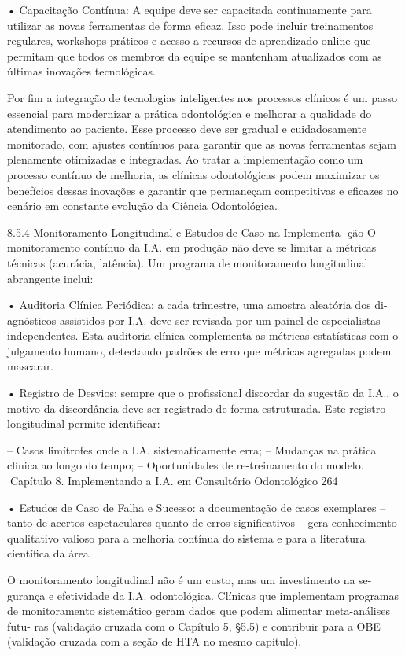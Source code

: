     • Capacitação Contínua: A equipe deve ser capacitada continuamente para utilizar
      as novas ferramentas de forma eficaz. Isso pode incluir treinamentos regulares,
      workshops práticos e acesso a recursos de aprendizado online que permitam
      que todos os membros da equipe se mantenham atualizados com as últimas
      inovações tecnológicas.

        Por fim a integração de tecnologias inteligentes nos processos clínicos é
um passo essencial para modernizar a prática odontológica e melhorar a qualidade
do atendimento ao paciente. Esse processo deve ser gradual e cuidadosamente
monitorado, com ajustes contínuos para garantir que as novas ferramentas sejam
plenamente otimizadas e integradas. Ao tratar a implementação como um processo
contínuo de melhoria, as clínicas odontológicas podem maximizar os benefícios dessas
inovações e garantir que permaneçam competitivas e eficazes no cenário em constante
evolução da Ciência Odontológica.

8.5.4 Monitoramento Longitudinal e Estudos de Caso na Implementa-
      ção
O monitoramento contínuo da I.A. em produção não deve se limitar a métricas técnicas
(acurácia, latência). Um programa de monitoramento longitudinal abrangente inclui:

    • Auditoria Clínica Periódica: a cada trimestre, uma amostra aleatória dos di-
      agnósticos assistidos por I.A. deve ser revisada por um painel de especialistas
      independentes. Esta auditoria clínica complementa as métricas estatísticas com o
      julgamento humano, detectando padrões de erro que métricas agregadas podem
      mascarar.

    • Registro de Desvios: sempre que o profissional discordar da sugestão da I.A., o
      motivo da discordância deve ser registrado de forma estruturada. Este registro
      longitudinal permite identificar:

         – Casos limítrofes onde a I.A. sistematicamente erra;
         – Mudanças na prática clínica ao longo do tempo;
         – Oportunidades de re-treinamento do modelo.
Capítulo 8. Implementando a I.A. em Consultório Odontológico                            264


    • Estudos de Caso de Falha e Sucesso: a documentação de casos exemplares –
      tanto de acertos espetaculares quanto de erros significativos – gera conhecimento
      qualitativo valioso para a melhoria contínua do sistema e para a literatura científica
      da área.

        O monitoramento longitudinal não é um custo, mas um investimento na se-
gurança e efetividade da I.A. odontológica. Clínicas que implementam programas
de monitoramento sistemático geram dados que podem alimentar meta-análises futu-
ras (validação cruzada com o Capítulo 5, §5.5) e contribuir para a OBE (validação
cruzada com a seção de HTA no mesmo capítulo).

